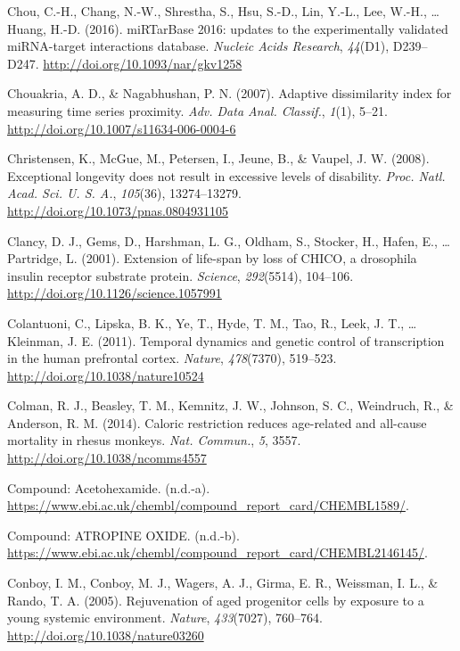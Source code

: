 \documentclass[12pt,twoside]{unicam}
\begin{document}
\begin{cslreferences}
\leavevmode\hypertarget{ref-Chou2016}{}%
Chou, C.-H., Chang, N.-W., Shrestha, S., Hsu, S.-D., Lin, Y.-L., Lee, W.-H., \ldots{} Huang, H.-D. (2016). miRTarBase 2016: updates to the experimentally validated miRNA-target interactions database. \emph{Nucleic Acids Research}, \emph{44}(D1), D239--D247. \url{http://doi.org/10.1093/nar/gkv1258}

\leavevmode\hypertarget{ref-Chouakria2007}{}%
Chouakria, A. D., \& Nagabhushan, P. N. (2007). Adaptive dissimilarity index for measuring time series proximity. \emph{Adv. Data Anal. Classif.}, \emph{1}(1), 5--21. \url{http://doi.org/10.1007/s11634-006-0004-6}

\leavevmode\hypertarget{ref-Christensen2008}{}%
Christensen, K., McGue, M., Petersen, I., Jeune, B., \& Vaupel, J. W. (2008). Exceptional longevity does not result in excessive levels of disability. \emph{Proc. Natl. Acad. Sci. U. S. A.}, \emph{105}(36), 13274--13279. \url{http://doi.org/10.1073/pnas.0804931105}

\leavevmode\hypertarget{ref-Clancy2001}{}%
Clancy, D. J., Gems, D., Harshman, L. G., Oldham, S., Stocker, H., Hafen, E., \ldots{} Partridge, L. (2001). Extension of life-span by loss of CHICO, a drosophila insulin receptor substrate protein. \emph{Science}, \emph{292}(5514), 104--106. \url{http://doi.org/10.1126/science.1057991}

\leavevmode\hypertarget{ref-Colantuoni2011}{}%
Colantuoni, C., Lipska, B. K., Ye, T., Hyde, T. M., Tao, R., Leek, J. T., \ldots{} Kleinman, J. E. (2011). Temporal dynamics and genetic control of transcription in the human prefrontal cortex. \emph{Nature}, \emph{478}(7370), 519--523. \url{http://doi.org/10.1038/nature10524}

\leavevmode\hypertarget{ref-Colman2014}{}%
Colman, R. J., Beasley, T. M., Kemnitz, J. W., Johnson, S. C., Weindruch, R., \& Anderson, R. M. (2014). Caloric restriction reduces age-related and all-cause mortality in rhesus monkeys. \emph{Nat. Commun.}, \emph{5}, 3557. \url{http://doi.org/10.1038/ncomms4557}

\leavevmode\hypertarget{ref-Acetohexamide2020}{}%
Compound: Acetohexamide. (n.d.-a). \url{https://www.ebi.ac.uk/chembl/compound_report_card/CHEMBL1589/}.

\leavevmode\hypertarget{ref-CHEMBL2146145}{}%
Compound: ATROPINE OXIDE. (n.d.-b). \url{https://www.ebi.ac.uk/chembl/compound_report_card/CHEMBL2146145/}.

\leavevmode\hypertarget{ref-Conboy2005}{}%
Conboy, I. M., Conboy, M. J., Wagers, A. J., Girma, E. R., Weissman, I. L., \& Rando, T. A. (2005). Rejuvenation of aged progenitor cells by exposure to a young systemic environment. \emph{Nature}, \emph{433}(7027), 760--764. \url{http://doi.org/10.1038/nature03260}


\end{cslreferences}
\end{document}
